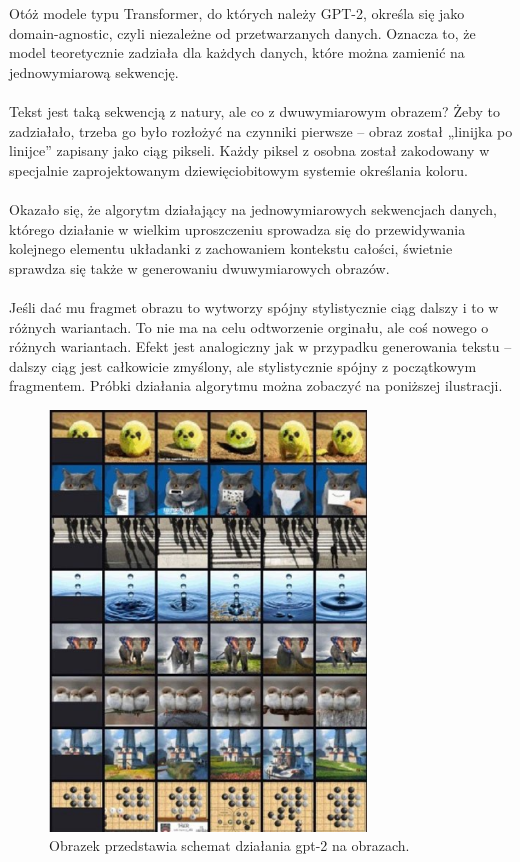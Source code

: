 \documentclass{article}
\begin{document}
Otóż modele typu Transformer, do których należy GPT-2, określa się jako domain-agnostic, czyli niezależne od przetwarzanych danych. Oznacza to, że model teoretycznie zadziała dla każdych danych, które można zamienić na jednowymiarową sekwencję.\\\\
Tekst jest taką sekwencją z natury, ale co z dwuwymiarowym obrazem? Żeby to zadziałało, trzeba go było rozłożyć na czynniki pierwsze – obraz został „linijka po linijce” zapisany jako ciąg pikseli. Każdy piksel z osobna został zakodowany w specjalnie zaprojektowanym dziewięciobitowym systemie określania koloru.\\\\
Okazało się, że algorytm działający na jednowymiarowych sekwencjach danych, którego działanie w wielkim uproszczeniu sprowadza się do przewidywania kolejnego elementu układanki z zachowaniem kontekstu całości, świetnie sprawdza się także w generowaniu dwuwymiarowych obrazów.\\\\
Jeśli dać mu fragmet obrazu to wytworzy spójny stylistycznie ciąg dalszy i to w różnych wariantach. To nie ma na celu odtworzenie orginału, ale coś nowego o różnych wariantach. Efekt jest analogiczny jak w przypadku generowania tekstu – dalszy ciąg jest całkowicie zmyślony, ale stylistycznie spójny z początkowym fragmentem. Próbki działania algorytmu można zobaczyć na poniższej ilustracji.
\begin{figure}[h]
        \centering
        \includegraphics[width=0.75\textwidth]{images/obrazki.png}
        \caption{Obrazek przedstawia schemat działania gpt-2 na obrazach.}
        \label{fig:mesh1}
    \end{figure}
\pagebreak
\end{document}
